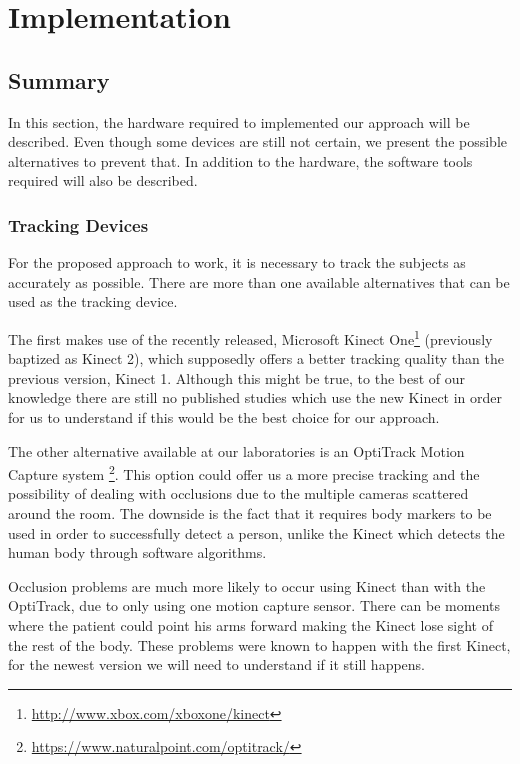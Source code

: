 \chapter{Implementation}
\label{sec:implementation}

\section*{Summary}
In this section, the hardware required to implemented our approach will be described. Even though some devices are still not certain, we present the possible alternatives to prevent that. In addition to the hardware, the software tools required will also be described. 

\subsection{Tracking Devices}

For the proposed approach to work, it is necessary to track the subjects as accurately as possible. There are more than one available alternatives that can be used as the tracking device.

The first makes use of the recently released, Microsoft Kinect One\footnote{\url{http://www.xbox.com/xboxone/kinect}} 
(previously baptized as Kinect 2), which supposedly offers a better tracking quality than 
the previous version, Kinect 1. Although this might be true, to the best of our knowledge there are still no published studies which use the new Kinect in order for us to understand if this would be the best choice for our approach.

The other alternative available at our laboratories is an OptiTrack Motion Capture system \footnote{\url{https://www.naturalpoint.com/optitrack/}}. 
This option could offer us a more precise tracking and the possibility of dealing with occlusions due to the multiple cameras scattered around the room. The downside is the fact that 
it requires body markers to be used in order to successfully detect a person, unlike the 
Kinect which detects the human body through software algorithms.

Occlusion problems are much more likely to occur using Kinect than with the OptiTrack, due to only using one motion capture sensor. There can be moments where the patient could point his arms forward making the Kinect lose sight of the rest of the body. These problems were known to happen with the first Kinect, for the newest version we will need to understand if it still happens.

